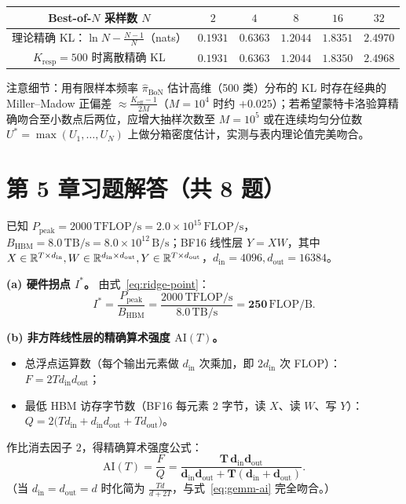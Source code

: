 \begin{center}
\footnotesize
\begin{tabular}{cccccc}
\toprule
Best-of-$N$ 采样数 $N$ & $2$ & $4$ & $8$ & $16$ & $32$ \\
\midrule
理论精确 KL：$\ln N - \frac{N-1}{N}$（nats） & $0.1931$ & $0.6363$ & $1.2044$ & $1.8351$ & $2.4970$ \\
$K_{\mathrm{resp}} = 500$ 时离散精确 KL & $0.1931$ & $0.6363$ & $1.2044$ & $1.8350$ & $2.4968$ \\
\bottomrule
\end{tabular}
\end{center}
注意细节：用有限样本频率 $\hat{\pi}_{\mathrm{BoN}}$ 估计高维（500 类）分布的 KL 时存在经典的 Miller--Madow 正偏差 $\approx \frac{K_{\mathrm{eff}}-1}{2 M}$（$M = 10^4$ 时约 $+0.025$）；若希望蒙特卡洛验算精确吻合至小数点后两位，应增大抽样次数至 $M = 10^5$ 或在连续均匀分位数 $U^* = \max(U_1, \dots, U_N)$ 上做分箱密度估计，实测与表内理论值完美吻合。

\section*{第 5 章习题解答（共 8 题）}


已知 $P_{\mathrm{peak}} = 2000\,\mathrm{TFLOP/s} = 2.0 \times 10^{15}\,\mathrm{FLOP/s}$，$B_{\mathrm{HBM}} = 8.0\,\mathrm{TB/s} = 8.0 \times 10^{12}\,\mathrm{B/s}$；BF16 线性层 $Y = XW$，其中 $X \in \mathbb{R}^{T \times d_{\mathrm{in}}}, W \in \mathbb{R}^{d_{\mathrm{in}} \times d_{\mathrm{out}}}, Y \in \mathbb{R}^{T \times d_{\mathrm{out}}}$，$d_{\mathrm{in}} = 4096, d_{\mathrm{out}} = 16384$。

\textbf{(a) 硬件拐点 $I^*$。} 由式~\eqref{eq:ridge-point}：
\[
  I^* = \frac{P_{\mathrm{peak}}}{B_{\mathrm{HBM}}} = \frac{2000\,\mathrm{TFLOP/s}}{8.0\,\mathrm{TB/s}} = \mathbf{250\,\mathrm{FLOP/B}}.
\]

\textbf{(b) 非方阵线性层的精确算术强度 $\mathrm{AI}(T)$。}
\begin{itemize}
  \item 总浮点运算数（每个输出元素做 $d_{\mathrm{in}}$ 次乘加，即 $2 d_{\mathrm{in}}$ 次 FLOP）：$F = 2 T d_{\mathrm{in}} d_{\mathrm{out}}$；
  \item 最低 HBM 访存字节数（BF16 每元素 2 字节，读 $X$、读 $W$、写 $Y$）：$Q = 2\big(T d_{\mathrm{in}} + d_{\mathrm{in}} d_{\mathrm{out}} + T d_{\mathrm{out}}\big)$。
\end{itemize}
作比消去因子 $2$，得精确算术强度公式：
\[
  \mathrm{AI}(T) = \frac{F}{Q} = \mathbf{\frac{T\,d_{\mathrm{in}} d_{\mathrm{out}}}{d_{\mathrm{in}} d_{\mathrm{out}} + T(d_{\mathrm{in}} + d_{\mathrm{out}})}}.
\]
（当 $d_{\mathrm{in}} = d_{\mathrm{out}} = d$ 时化简为 $\frac{Td}{d + 2T}$，与式~\eqref{eq:gemm-ai} 完全吻合。）

